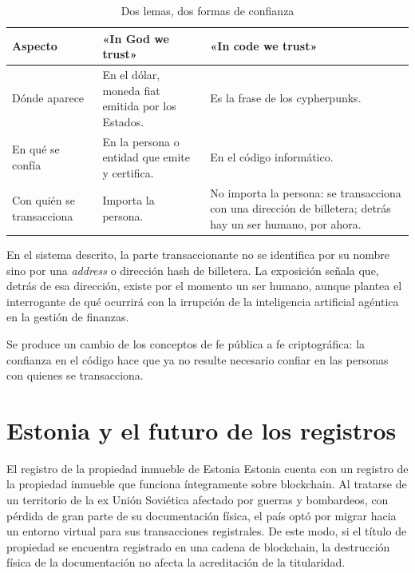 \documentclass[12pt,oneside]{book}
\begin{document}
\begin{table}[H]
\centering
\caption{Dos lemas, dos formas de confianza}
\begin{tabular}{p{}p{}p{}}
\toprule
\textbf{Aspecto} & \textbf{«In God we trust»} & \textbf{«In code we trust»} \\
\midrule
Dónde aparece & En el dólar, moneda fiat emitida por los Estados. & Es la frase de los cypherpunks. \\
En qué se confía & En la persona o entidad que emite y certifica. & En el código informático. \\
Con quién se transacciona & Importa la persona. & No importa la persona: se transacciona con una dirección de billetera; detrás hay un ser humano, por ahora. \\
\bottomrule
\end{tabular}
\end{table}

En el sistema descrito, la parte transaccionante no se identifica por su nombre sino por una \textit{address} o dirección hash de billetera. La exposición señala que, detrás de esa dirección, existe por el momento un ser humano, aunque plantea el interrogante de qué ocurrirá con la irrupción de la inteligencia artificial agéntica en la gestión de finanzas.

\begin{important}
Se produce un cambio de los conceptos de fe pública a fe criptográfica: la confianza en el código hace que ya no resulte necesario confiar en las personas con quienes se transacciona.
\end{important}

\section{Estonia y el futuro de los registros}

\begin{example}{El registro de la propiedad inmueble de Estonia}
Estonia cuenta con un registro de la propiedad inmueble que funciona íntegramente sobre blockchain. Al tratarse de un territorio de la ex Unión Soviética afectado por guerras y bombardeos, con pérdida de gran parte de su documentación física, el país optó por migrar hacia un entorno virtual para sus transacciones registrales. De este modo, si el título de propiedad se encuentra registrado en una cadena de blockchain, la destrucción física de la documentación no afecta la acreditación de la titularidad.
\end{example}
\end{document}

